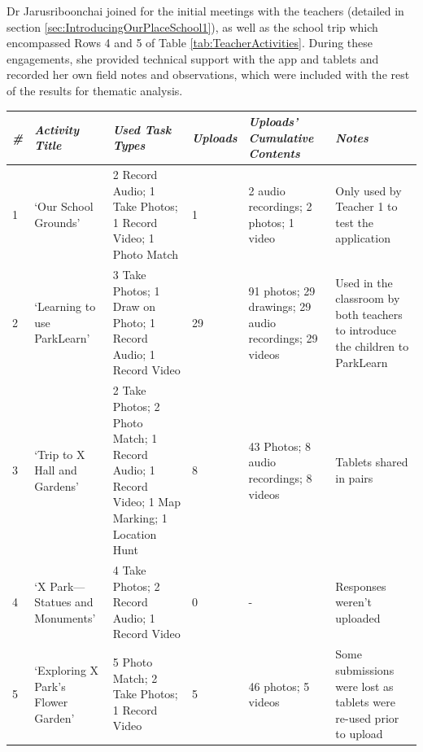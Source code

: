 Dr Jarusriboonchai joined for the initial meetings with the teachers (detailed in section \ref{sec:IntroducingOurPlaceSchool1}), as well as the school trip which encompassed Rows 4 and 5 of Table \ref{tab:TeacherActivities}. During these engagements, she provided technical support with the app and tablets and recorded her own field notes and observations, which were included with the rest of the results for thematic analysis.   

\begin{table}[]
    \centering
    \begin{tabularx}{\linewidth}{ 
| p{4mm} 
| >{\raggedright\arraybackslash}X 
| >{\raggedright\arraybackslash}X 
| p{13mm}
| >{\raggedright\arraybackslash}X 
| >{\raggedright\arraybackslash}X 
|}
\hline
\small\textit{\#}
    & \small\textit{Activity Title} 
    & \small\textit{Used Task Types}
    & \small\textit{Uploads}
    & \small\textit{Uploads' Cumulative Contents}
    & \small\textit{Notes}\\
\hline
\small 1 
    & \footnotesize `Our School Grounds' 
    & \footnotesize 2 Record Audio; 1 Take Photos; 1 Record Video; 1 Photo Match 
    & \footnotesize 1  
    & \footnotesize 2 audio recordings; 2 photos; 1 video
    & \footnotesize Only used by Teacher 1 to test the application\\
\hline
\small 2
    & \footnotesize `Learning to use ParkLearn' 
    & \footnotesize 3 Take Photos; 1 Draw on Photo; 1 Record Audio; 1 Record Video 
    & \footnotesize 29  
    & \footnotesize 91 photos; 29 drawings; 29 audio recordings; 29 videos
    & \footnotesize Used in the classroom by both teachers to introduce the children to ParkLearn\\
\hline
\small 3
    & \footnotesize `Trip to X Hall and Gardens' 
    & \footnotesize 2 Take Photos; 2 Photo Match; 1 Record Audio; 1 Record Video; 1 Map Marking; 1 Location Hunt 
    & \footnotesize 8  
    & \footnotesize 43 Photos; 8 audio recordings; 8 videos
    & \footnotesize Tablets shared in pairs\\
\hline
\small 4 
    & \footnotesize `X Park---Statues and Monuments' 
    & \footnotesize 4 Take Photos; 2 Record Audio; 1 Record Video
    & \footnotesize 0  
    & \footnotesize -
    & \footnotesize Responses weren't uploaded\\
\hline
    \small 5 
    & \footnotesize `Exploring X Park's Flower Garden' 
    & \footnotesize 5 Photo Match; 2 Take Photos; 1 Record Video
    & \footnotesize 5 
    & \footnotesize 46 photos; 5 videos
    & \footnotesize Some submissions were lost as tablets were re-used prior to upload\\

\end{tabularx}
\end{table}
